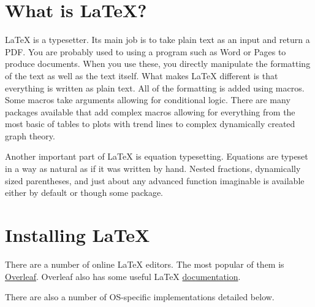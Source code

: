 \section{What is \LaTeX?}
\LaTeX{} is a typesetter. Its main job is to take plain text as an input and return a PDF. You are probably used to using a program such as Word or Pages to produce documents. When you use these, you directly manipulate the formatting of the text as well as the text itself. What makes \LaTeX{} different is that everything is written as plain text. All of the formatting is added using macros. Some macros take arguments allowing for conditional logic. There are many packages available that add complex macros allowing for everything from the most basic of tables to plots with trend lines to complex dynamically created graph theory.\par
Another important part of \LaTeX{} is equation typesetting. Equations are typeset in a way as natural as if it was written by hand. Nested fractions, dynamically sized parentheses, and just about any advanced function imaginable is available either by default or though some package.\par


\section{Installing \LaTeX}
There are a number of online \LaTeX{} editors. The most popular of them is \href{https://www.overleaf.com}{Overleaf}. Overleaf also has some useful \LaTeX{} \href{https://www.overleaf.com/learn}{documentation}.\par
There are also a number of OS-specific implementations detailed below.

